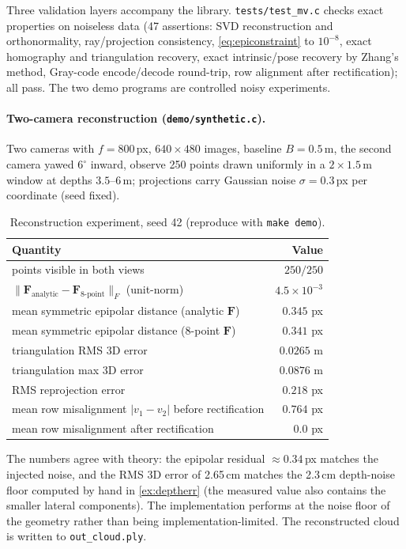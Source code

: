 \documentclass[11pt]{article}
\theoremstyle{definition}
\newcommand{\mat}[1]{\mathbf{#1}}
\newcommand{\F}{\mat{F}}
\newcommand{\code}[1]{\texttt{#1}}
\begin{document}
Three validation layers accompany the library. \code{tests/test\_mv.c}
checks exact properties on noiseless data (47 assertions: SVD
reconstruction and orthonormality, ray/projection consistency,
\eqref{eq:epiconstraint} to $10^{-8}$, exact homography and triangulation
recovery, exact intrinsic/pose recovery by Zhang's method, Gray-code
encode/decode round-trip, row alignment after rectification); all pass.
The two demo programs are controlled noisy experiments.

\paragraph{Two-camera reconstruction (\code{demo/synthetic.c}).} Two
cameras with $f=800$\,px, $640\times480$ images, baseline $B=0.5$\,m, the
second camera yawed $6^\circ$ inward, observe 250 points drawn uniformly in
a $2\times1.5$\,m window at depths $3.5$--$6$\,m; projections carry
Gaussian noise $\sigma=0.3$\,px per coordinate (seed fixed).

\begin{table}[ht]
\centering
\begin{tabular}{lr}
\toprule
Quantity & Value \\
\midrule
points visible in both views                       & $250/250$ \\
$\|\F_{\text{analytic}}-\F_{\text{8-point}}\|_F$ (unit-norm)  & $4.5\times10^{-3}$ \\
mean symmetric epipolar distance (analytic $\F$)   & $0.345$ px \\
mean symmetric epipolar distance (8-point $\F$)    & $0.341$ px \\
triangulation RMS 3D error                         & $0.0265$ m \\
triangulation max 3D error                         & $0.0876$ m \\
RMS reprojection error                             & $0.218$ px \\
mean row misalignment $|v_1-v_2|$ before rectification & $0.764$ px \\
mean row misalignment after rectification          & $0.0$ px \\
\bottomrule
\end{tabular}
\caption{Reconstruction experiment, seed 42 (reproduce with \code{make demo}).}
\label{tab:results}
\end{table}

The numbers agree with theory: the epipolar residual $\approx0.34$\,px
matches the injected noise, and the RMS 3D error of 2.65\,cm matches the
2.3\,cm depth-noise floor computed by hand in \autoref{ex:deptherr} (the
measured value also contains the smaller lateral components). The
implementation performs at the noise floor of the geometry rather than
being implementation-limited. The reconstructed cloud is written to
\code{out\_cloud.ply}.
\end{document}
